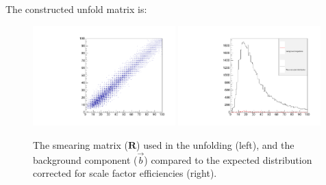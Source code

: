 \documentclass[a4paper,11pt]{article}
\begin{document}
The constructed unfold matrix is:
\begin{figure}[H]
	\centering
	\includegraphics[width=0.49\textwidth]{figs2/matrix.pdf}
	\includegraphics[width=0.49\textwidth]{figs2/bkg.pdf}
	\caption{The smearing matrix ($\mathbf{R}$) used in the unfolding (left), and the background component ($\vec{b}$) compared to the expected distribution corrected for scale factor efficiencies (right).
	}
\end{figure}
\end{document}
